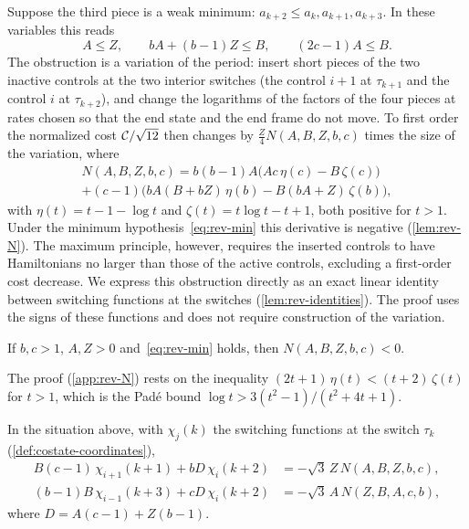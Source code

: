 Suppose the third piece is a weak minimum: $a_{k+2}\le a_k,a_{k+1},a_{k+3}$. In these variables
this reads
\begin{equation}\label{eq:rev-min}
  A\le Z,\qquad bA+(b-1)Z\le B,\qquad (2c-1)A\le B.
\end{equation}
The obstruction is a variation of the period: insert short pieces of the two
inactive controls at the two interior switches (the control $i+1$ at $\tau_{k+1}$ and the
control $i$ at $\tau_{k+2}$), and change the logarithms of the factors of the four pieces at
rates chosen so that the end state and the end frame do not move. To first order the normalized
cost $\mathcal{C}/\sqrt{12}$ then changes by $\frac{Z}{4}N(A,B,Z,b,c)$ times the size of the variation, where
\begin{multline}\label{eq:rev-N}
  N(A,B,Z,b,c)=b(b-1)A\bigl(Ac\,\eta(c)-B\,\zeta(c)\bigr)\\
  +(c-1)\bigl(bA(B+bZ)\,\eta(b)-B(bA+Z)\,\zeta(b)\bigr),
\end{multline}
with $\eta(t)=t-1-\log t$ and $\zeta(t)=t\log t-t+1$, both positive for $t>1$. Under the
minimum hypothesis~\eqref{eq:rev-min} this derivative is negative
(\cref{lem:rev-N}). The maximum principle, however, requires the inserted controls to have
Hamiltonians no larger than those of the active controls, excluding a first-order cost decrease.
We express this obstruction directly as an exact linear identity between switching functions
at the switches (\cref{lem:rev-identities}). The proof uses the signs of these functions and
does not require construction of the variation.

\begin{lemma}\label{lem:rev-N}
If $b,c>1$, $A,Z>0$ and~\eqref{eq:rev-min} holds, then $N(A,B,Z,b,c)<0$.
\end{lemma}

The proof (\cref{app:rev-N}) rests on the inequality $(2t+1)\,\eta(t)<(t+2)\,\zeta(t)$ for $t>1$,
which is the Pad\'e bound $\log t>3(t^2-1)/(t^2+4t+1)$.

\begin{lemma}\label{lem:rev-identities}
In the situation above, with $\chi_j(k)$ the switching functions at the switch $\tau_k$
(\cref{def:costate-coordinates}),
\begin{align}
  B(c-1)\,\chi_{i+1}(k+1)+bD\,\chi_i(k+2)&=-\sqrt3\,Z\,N(A,B,Z,b,c),\label{eq:rev-third}\\
  (b-1)B\,\chi_{i-1}(k+3)+cD\,\chi_i(k+2)&=-\sqrt3\,A\,N(Z,B,A,c,b),\label{eq:rev-second}
\end{align}
where $D=A(c-1)+Z(b-1)$.
\end{lemma}

